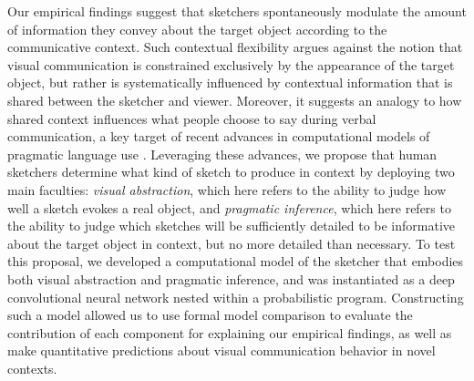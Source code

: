 \documentclass[9pt,twocolumn,twoside]{pnas-new}
\begin{document}
Our empirical findings suggest that sketchers spontaneously modulate the amount of information they convey about the target object according to the communicative context. 
Such contextual flexibility argues against the notion that visual communication is constrained exclusively by the appearance of the target object, but rather is systematically influenced by contextual information that is shared between the sketcher and viewer. 
Moreover, it suggests an analogy to how shared context influences what people choose to say during verbal communication, a key target of recent advances in computational models of pragmatic language use \cite{frank2012predicting,goodman2013knowledge,franke2016probabilistic,bergen2016pragmatic}.
Leveraging these advances, we propose that human sketchers determine what kind of sketch to produce in context by deploying two main faculties: \textit{visual abstraction}, which here refers to the ability to judge how well a sketch evokes a real object, and \textit{pragmatic inference}, which here refers to the ability to judge which sketches will be sufficiently detailed to be informative about the target object in context, but no more detailed than necessary. 
To test this proposal, we developed a computational model of the sketcher that embodies both visual abstraction and pragmatic inference, and was instantiated as a deep convolutional neural network nested within a probabilistic program. 
Constructing such a model allowed us to use formal model comparison to evaluate the contribution of each component for explaining our empirical findings, as well as make quantitative predictions about visual communication behavior in novel contexts.
\end{document}
